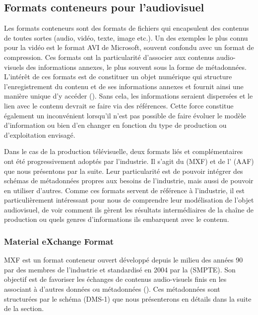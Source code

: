 \subsection{Formats conteneurs pour l'audiovisuel} \label{sec:wrapper}
Les formats conteneurs sont des formats de fichiers qui encapsulent des contenus de toutes sortes (audio, vidéo, texte, image etc.). 
Un des exemples le plus connu pour la vidéo est le format AVI de Microsoft, souvent confondu avec un format de compression. 
Ces formats ont la particularité d'associer aux contenus audio-visuels des informations annexes, le plus souvent sous la forme de métadonnées.
L'intérêt de ces formats est de constituer un objet numérique qui structure l'enregistrement du contenu et de ses informations annexes et fournit ainsi une manière unique d'y accéder (\cite{Ferreira2010}).
Sans cela, les informations seraient dispersées et le lien avec le contenu devrait se faire via des références. 
Cette force constitue également un inconvénient lorsqu'il n'est pas possible de faire évoluer le modèle d'information ou bien d'en changer en fonction du type de production ou d'exploitation envisagé.

Dans le cas de la production télévisuelle, deux formats liés et complémentaires ont été progressivement adoptés par l'industrie.  
Il s'agit du  (MXF) et de l' (AAF) que nous présentons par la suite. 
Leur particularité est de pouvoir intégrer des schémas de métadonnées propres aux besoins de l'industrie, mais aussi de pouvoir en utiliser d'autres. 
Comme ces formats servent de référence à l'industrie, il est particulièrement intéressant pour nous de comprendre leur modélisation de l'objet audiovisuel, de voir comment ils gèrent les résultats intermédiaires de la chaîne de production ou quels genres d'informations ils embarquent avec le contenu.


\subsubsection{Material eXchange Format}\label{sec:mxf}
MXF est un format conteneur ouvert développé depuis le milieu des années 90 par des membres de l'industrie et standardisé en 2004 par la  (SMPTE).
Son objectif est de favoriser les échanges de contenus audio-visuels finis en les associant à d'autres données ou métadonnées (\cite{Devlin2002}).
Ces métadonnées sont structurées par le schéma  (DMS-1) que nous présenterons en détails dans la suite de la section. 

